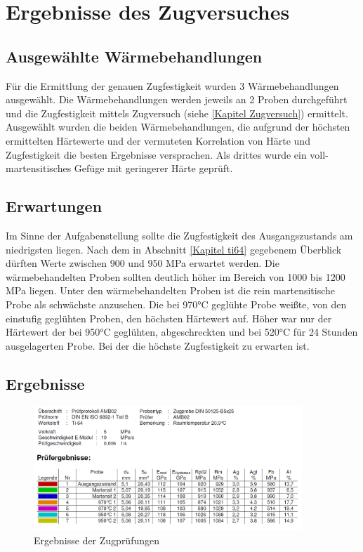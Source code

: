 \documentclass[a4paper, 11pt]{tubsreprt}
\begin{document}
\section{Ergebnisse des Zugversuches}
\subsection{Ausgewählte Wärmebehandlungen}
Für die Ermittlung der genauen Zugfestigkeit wurden 3 Wärmebehandlungen ausgewählt. Die Wärmebehandlungen werden  jeweils an 2 Proben durchgeführt und die Zugfestigkeit mittels Zugversuch (siehe  \ref{Kapitel Zugversuch}) ermittelt. Ausgewählt wurden die beiden Wärmebehandlungen, die aufgrund der höchsten ermittelten Härtewerte und der vermuteten Korrelation von Härte und Zugfestigkeit die besten Ergebnisse versprachen. Als drittes wurde ein voll-martensitisches Gefüge mit geringerer Härte geprüft. 
\subsection{Erwartungen}
Im Sinne der Aufgabenstellung sollte die Zugfestigkeit des Ausgangszustands am niedrigsten liegen. Nach dem in Abschnitt \ref{Kapitel ti64} gegebenem Überblick dürften Werte zwischen 900 und 950 MPa erwartet werden. Die wärmebehandelten Proben sollten deutlich höher im Bereich von 1000 bis 1200 MPa liegen. Unter den wärmebehandelten Proben ist die rein martensitische Probe als schwächste anzusehen. Die bei 970°C geglühte Probe weißte, von den einstufig geglühten Proben, den höchsten Härtewert auf. Höher war nur der Härtewert der bei 950°C geglühten, abgeschreckten und bei 520°C für 24 Stunden ausgelagerten Probe. Bei der die höchste Zugfestigkeit zu erwarten ist.

\subsection{Ergebnisse}

\begin{figure}
\centering
\includegraphics[width=0.9\textwidth]{Bilder/Zugpruefungergebnisse.png}
\caption{Ergebnisse der Zugprüfungen}
\label{Ergebnisse der Zugpruefungen}
\end{figure}
\end{document}

